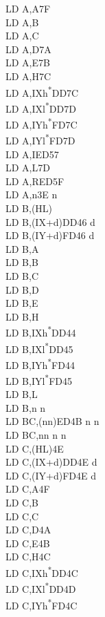 \documentclass[twoside,openright,a4paper]{book}
\begin{document}
\begin{multicols}{3}
{\begin{tabbing}
	LD A,A\>7F\\
	LD A,B\\
	LD A,C\\
	LD A,D\>7A\\
	LD A,E\>7B\\
	LD A,H\>7C\\
	LD A,IXh\textsuperscript{*}\>DD7C\\
	LD A,IXl\textsuperscript{*}\>DD7D\\
	LD A,IYh\textsuperscript{*}\>FD7C\\
	LD A,IYl\textsuperscript{*}\>FD7D\\
	LD A,I\>ED57\\
	LD A,L\>7D\\
	LD A,R\>ED5F\\
	LD A,n\>3E n\\
	LD B,(HL)\\
	LD B,(IX+d)\>DD46 d\\
	LD B,(IY+d)\>FD46 d\\
	LD B,A\\
	LD B,B\\
	LD B,C\\
	LD B,D\\
	LD B,E\\
	LD B,H\\
	LD B,IXh\textsuperscript{*}\>DD44\\
	LD B,IXl\textsuperscript{*}\>DD45\\
	LD B,IYh\textsuperscript{*}\>FD44\\
	LD B,IYl\textsuperscript{*}\>FD45\\
	LD B,L\\
	LD B,n n\\
	LD BC,(nn)\>ED4B n n\\
	LD BC,nn n n\\
	LD C,(HL)\>4E\\
	LD C,(IX+d)\>DD4E d\\
	LD C,(IY+d)\>FD4E d\\
	LD C,A\>4F\\
	LD C,B\\
	LD C,C\\
	LD C,D\>4A\\
	LD C,E\>4B\\
	LD C,H\>4C\\
	LD C,IXh\textsuperscript{*}\>DD4C\\
	LD C,IXl\textsuperscript{*}\>DD4D\\
	LD C,IYh\textsuperscript{*}\>FD4C\\

\end{tabbing}}
\end{multicols}
\end{document}
